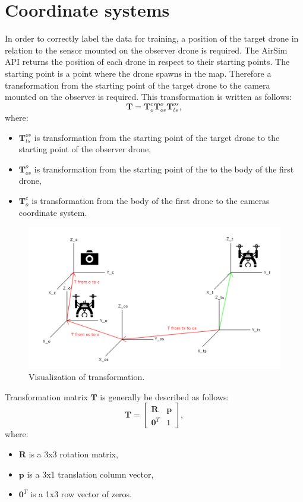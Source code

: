 \documentclass[twoside]{ctuthesis}
\theoremstyle{plain}
\theoremstyle{definition}
\theoremstyle{note}
\begin{document}
\section{Coordinate systems}
In order to correctly label the data for training, a position of the target drone in relation to the sensor mounted on the observer drone is required. The AirSim API returns the position of each drone in respect to their starting points. The starting point is a point where the drone spawns in the map. Therefore a transformation from the starting point of the target drone to the camera mounted on the observer is required. This transformation is written as follows:
\begin{equation}
	\textbf{T}=\textbf{T}_{o}^{c}\textbf{T}_{os}^{o}\textbf{T}_{ts}^{os},
\end{equation}
where:
\begin{itemize}
	\item $\textbf{T}_{ts}^{os}$ is transformation from the starting point of the target drone to the starting point of the observer drone,
	\item $\textbf{T}_{os}^{o}$ is transformation from the starting point of the  to the body of the first drone,
	\item $\textbf{T}_{o}^{c}$ is transformation from the body of the first drone to the cameras coordinate system.
\end{itemize}
\begin{figure}[h]
	\centering
	\includegraphics[width=\textwidth]{coord_schema.png}
	\caption{Visualization of transformation.}
\end{figure}
Transformation matrix $\textbf{T}$ is generally be described as follows:
\begin{equation}
	\textbf{T}=\begin{bmatrix}
		\textbf{R} & \textbf{p}\\
		\textbf{0}^T & 1
	\end{bmatrix},
\end{equation}
where:
\begin{itemize}
	\item $\textbf{R}$ is a 3x3 rotation matrix,
	\item $\textbf{p}$ is a 3x1 translation column vector,
	\item $\textbf{0}^T$ is a 1x3 row vector of zeros.
\end{itemize}
\end{document}
